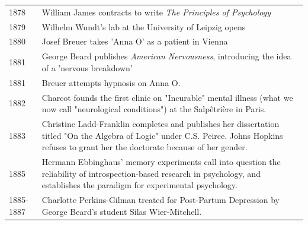 \begin{refsection}
\begin{longtable}[!t]{ | P{2cm} | P{11.8cm} | }
1878&William James contracts to write \emph{The Principles of Psychology}  \\
1879&Wilhelm Wundt’s lab at the University of Leipzig opens  \\
1880&Josef Breuer takes 'Anna O' as a patient in Vienna  \\
1881&George Beard publishes \emph{American Nervousness}, introducing the idea of a 'nervous breakdown'  \\
1881&Breuer attempts hypnosis on Anna O. \\
1882&Charcot founds the first clinic on "Incurable" mental illness (what we now call "neurological conditions") at the Salpêtrière in Paris.  \\
1883&Christine Ladd-Franklin completes and publishes her dissertation titled "On the Algebra of Logic" under C.S. Peirce. Johns Hopkins refuses to grant her the doctorate because of her gender.  \\
1885&Hermann Ebbinghaus’ memory experiments call into question the reliability of introspection-based research in psychology, and establishes the paradigm for experimental psychology. \\
1885-1887&Charlotte Perkins-Gilman treated for Post-Partum Depression by George Beard's student Silas Wier-Mitchell. \\


\end{longtable}
\end{refsection}
